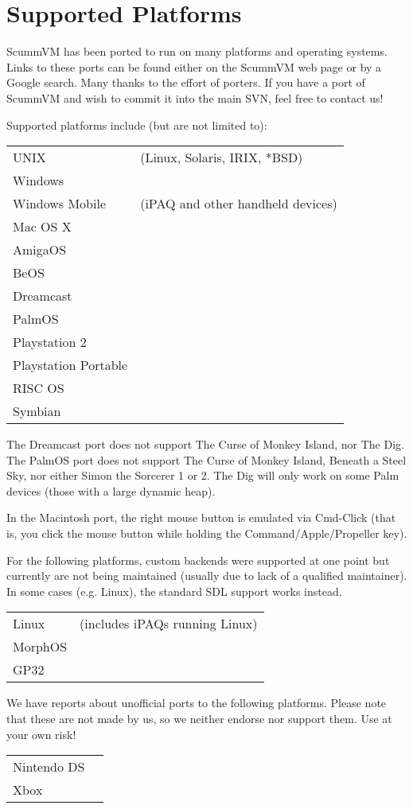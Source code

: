 \section{Supported Platforms}

ScummVM has been ported to run on many platforms and operating systems.
Links to these ports can be found either on the ScummVM web page or by a
Google search. Many thanks to the effort of porters. If you have a port of
ScummVM and wish to commit it into the main SVN, feel free to contact us!

Supported platforms include (but are not limited to):

\begin{tabular}{ll}
UNIX            &(Linux, Solaris, IRIX, *BSD)\\
Windows         \\
Windows Mobile  &(iPAQ and other handheld devices)\\
Mac OS X        \\
AmigaOS         \\
BeOS            \\
Dreamcast       \\
PalmOS          \\
Playstation 2   \\
Playstation Portable\\
RISC OS         \\
Symbian         \\
\end{tabular}

The Dreamcast port does not support The Curse of Monkey Island, nor The Dig.
The PalmOS port does not support The Curse of Monkey Island, Beneath a Steel
Sky, nor either Simon the Sorcerer 1 or 2. The Dig will only work on some
Palm devices (those with a large dynamic heap).

In the Macintosh port, the right mouse button is emulated via Cmd-Click (that
is, you click the mouse button while holding the Command/Apple/Propeller key).

For the following platforms, custom backends were supported at one point
but currently are not being maintained (usually due to lack of a qualified
maintainer). In some cases (e.g. Linux), the standard SDL support works
instead.

\begin{tabular}{ll}
Linux           &(includes iPAQs running Linux)\\
MorphOS\\
GP32   \\
\end{tabular}

We have reports about unofficial ports to the following platforms. Please
note that these are not made by us, so we neither endorse nor support them.
Use at your own risk!

\begin{tabular}{ll}
Nintendo DS\\
Xbox       \\
\end{tabular}


